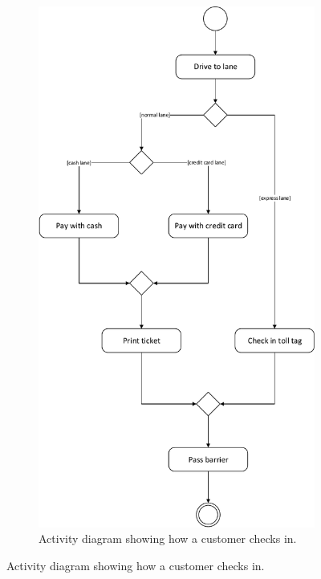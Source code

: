 \begin{figure}[H]
	\centering
	\begin{subfigure}[b]{0.6\textwidth}
	\includegraphics[width=\textwidth]{img/activity_diagram/check_in}
	\caption{Activity diagram showing how a customer checks in.}
	\end{subfigure}
\end{figure}

